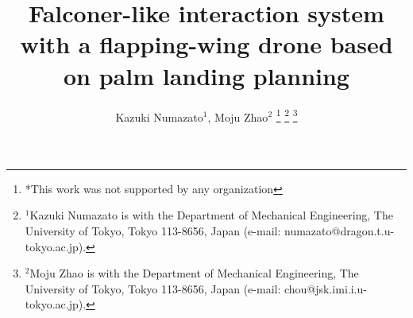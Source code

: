 \documentclass[letterpaper, 10 pt, conference]{ieeeconf}  %
\title{\LARGE \bf
Falconer-like interaction system with a flapping-wing drone based on palm landing planning
}
\author{Kazuki Numazato$^{1}$, Moju Zhao$^{2}$ %
\thanks{*This work was not supported by any organization}%
\thanks{$^{1}$Kazuki Numazato is with the Department of Mechanical Engineering, The University
        of Tokyo, Tokyo 113-8656, Japan (e-mail: numazato@dragon.t.u-tokyo.ac.jp).}%
\thanks{$^{2}$Moju Zhao is with the Department of Mechanical Engineering, The University
        of Tokyo, Tokyo 113-8656, Japan (e-mail: chou@jsk.imi.i.u-tokyo.ac.jp).}%
}
\begin{document}
\maketitle
\thispagestyle{empty}
\pagestyle{empty}

\begin{abstract}

\end{abstract}








\addtolength{\textheight}{-12cm}   %



\end{document}
